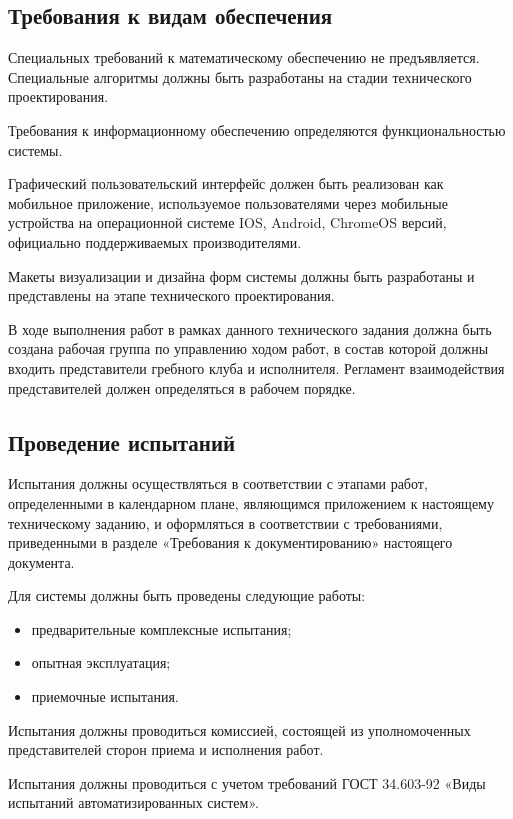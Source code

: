 \documentclass[14pt]{extreport}
\begin{document}
\subsection{Требования к видам обеспечения}

Специальных требований к математическому обеспечению не
предъявляется. Специальные алгоритмы должны быть разработаны на стадии
технического проектирования.

Требования к информационному обеспечению определяются
функциональностью системы.

Графический пользовательский интерфейс должен быть реализован как
мобильное приложение, используемое пользователями через мобильные устройства на операционной системе IOS, Android, ChromeOS версий, официально поддерживаемых производителями.

Макеты визуализации и дизайна форм системы должны быть разработаны и
представлены на этапе технического проектирования.

В ходе выполнения работ в рамках данного технического задания должна
быть создана рабочая группа по управлению ходом работ, в состав которой
должны входить представители гребного клуба и исполнителя. Регламент взаимодействия представителей должен определяться в рабочем порядке.

\subsection{Проведение испытаний}

Испытания должны осуществляться в соответствии с этапами работ,
определенными в календарном плане, являющимся приложением к настоящему
техническому заданию, и оформляться в соответствии с требованиями,
приведенными в разделе «Требования к документированию» настоящего
документа.

Для системы должны быть проведены следующие работы:
\begin{itemize}
\item предварительные комплексные испытания;
\item опытная эксплуатация;
\item приемочные испытания.
\end{itemize}

Испытания должны проводиться комиссией, состоящей из
уполномоченных представителей сторон приема и исполнения работ.

Испытания должны проводиться с учетом требований ГОСТ 34.603-92
«Виды испытаний автоматизированных систем».
\end{document}
